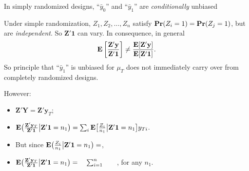 \begin{frame}{In simply randomized designs, ``$\bar{y}_{0}$'' and 
    ``$\bar{y}_{1}$'' are \emph{conditionally} unbiased} 

Under simple randomization, $Z_{1}, Z_{2}, \ldots, Z_{n}$ satisfy
$\mathbf{Pr}(Z_{i} =1) = \mathbf{Pr}(Z_{j} = 1)$, but are \textit{independent}.  So
$\mathbf{Z}'\mathbf{1}$ can vary. In consequence, in general
$$ \mathbf{E}\left[\frac{\mathbf{Z}'\mathbf{y}}{\mathbf{Z}'\mathbf{1}} \right] \neq
\frac{\mathbf{E}[ \mathbf{Z}'\mathbf{y} ]}{\mathbf{E}[ \mathbf{Z}'\mathbf{1} ]} .$$
 So principle that ``$\bar{y}_1$'' is unbiased for $\mu_{T}$ does not
 immediately carry over from completely randomized designs.
\pause

However:
  \begin{itemize}
  \item $\mathbf{Z}'\mathbf{Y} = \mathbf{Z}'\mathbf{y}_{T}$;
\item $\mathbf{E}  \big(
  \frac{\mathbf{Z}'\mathbf{y}_{T}}{\mathbf{Z}'\mathbf{1}}\big|
  \mathbf{Z}'\mathbf{1} =n_{1}\big) = \sum_{i} \mathbf{E}
  \big[\frac{Z_{i}}{n_{1}} \big|
  \mathbf{Z}'\mathbf{1} = n_{1} \big] y_{Ti} $. 
\item But since $ \mathbf{E} \big(\frac{Z_{i}}{n_{1}} \big|
  \mathbf{Z}'\mathbf{1} =n_{1}\big)=$\hspace{5em},
\item $\mathbf{E}  \big(
  \frac{\mathbf{Z}'\mathbf{y}_{T}}{\mathbf{Z}'\mathbf{1}}\big|
  \mathbf{Z}'\mathbf{1} =n_{1}\big) = \hspace{1em} \sum_{i=1}^{n} \hspace{2em}$, for any $n_{1}$. 
  \end{itemize}
\end{frame}

